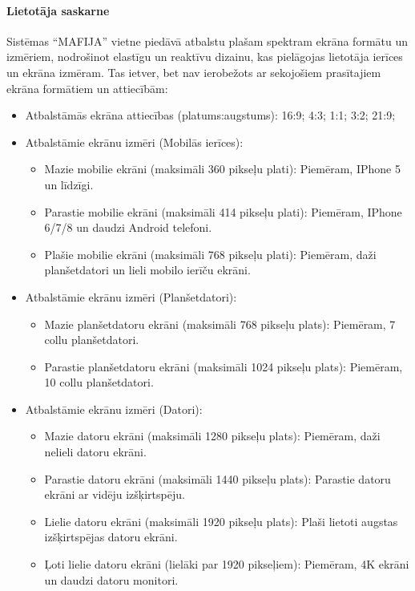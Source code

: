 \paragraph{Lietotāja saskarne}
Sistēmas ``MAFIJA'' vietne piedāvā atbalstu plašam spektram ekrāna formātu un izmēriem,
nodrošinot elastīgu un reaktīvu dizainu, kas pielāgojas lietotāja ierīces un ekrāna izmēram.
Tas ietver, bet nav ierobežots ar sekojošiem prasītajiem ekrāna formātiem un attiecībām:

\begin{itemize}
	\item Atbalstāmās ekrāna attiecības (platums:augstums): 16:9; 4:3; 1:1; 3:2; 21:9;
	\item Atbalstāmie ekrānu izmēri (Mobilās ierīces):
	      \begin{itemize}
		      \item Mazie mobilie ekrāni (maksimāli 360 pikseļu plati): Piemēram, IPhone 5 un līdzīgi.
		      \item Parastie mobilie ekrāni (maksimāli 414 pikseļu plati): Piemēram, IPhone 6/7/8 un daudzi Android telefoni.
		      \item Plašie mobilie ekrāni (maksimāli 768 pikseļu plati): Piemēram, daži planšetdatori un lieli mobilo ierīču ekrāni.
	      \end{itemize}

	\item Atbalstāmie ekrānu izmēri (Planšetdatori):
	      \begin{itemize}
		      \item Mazie planšetdatoru ekrāni (maksimāli 768 pikseļu plats): Piemēram, 7 collu planšetdatori.
		      \item Parastie planšetdatoru ekrāni (maksimāli 1024 pikseļu plats): Piemēram, 10 collu planšetdatori.
	      \end{itemize}

	\item Atbalstāmie ekrānu izmēri (Datori):
	      \begin{itemize}
		      \item Mazie datoru ekrāni (maksimāli 1280 pikseļu plats): Piemēram, daži nelieli datoru ekrāni.
		      \item Parastie datoru ekrāni (maksimāli 1440 pikseļu plats): Parastie datoru ekrāni ar vidēju izšķirtspēju.
		      \item Lielie datoru ekrāni (maksimāli 1920 pikseļu plats): Plaši lietoti augstas izšķirtspējas datoru ekrāni.
		      \item Ļoti lielie datoru ekrāni (lielāki par 1920 pikseļiem): Piemēram, 4K ekrāni un daudzi datoru monitori.
	      \end{itemize}
\end{itemize}

